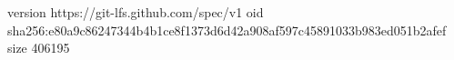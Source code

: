 version https://git-lfs.github.com/spec/v1
oid sha256:e80a9c86247344b4b1ce8f1373d6d42a908af597c45891033b983ed051b2afef
size 406195
